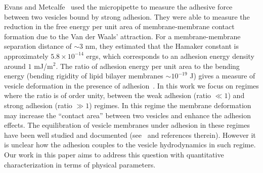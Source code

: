 \documentclass[prf,superscriptaddress,showpacs]{revtex4-1}
\begin{document}
Evans and Metcalfe~\cite{EvansMetcalfe1984_BJ} used the micropipette to measure the adhesive force between two vesicles bound by strong adhesion.
They were able to  measure the
reduction in the free energy per unit area of membrane-membrane contact
formation due to the Van der Waals' attraction. For a membrane-membrane
separation distance of $\sim 3$ nm, they estimated that the Hamaker
constant is approximately $5.8\times 10^{-14}$ ergs, which corresponds
to an adhesion energy density around $1$ mJ/m$^2$. The ratio of adhesion
energy per unit area to the bending energy (bending rigidity of lipid
bilayer membranes $\sim 10^{-19}$ J) gives a measure of vesicle
deformation in the presence of
adhesion~\cite{RamachandranAndersonLealIsraelachvili2010_Langmuir}. In
this work we focus on regimes where the ratio is of order unity, between
the weak adhesion (ratio $\ll 1$) and strong adhesion (ratio $\gg 1$)
regimes.  In this regime the membrane deformation may increase the
``contact area'' between two vesicles and enhance the adhesion effects.
The equilibration of vesicle membranes under adhesion in these regimes
have been well studied and documented
(see~\cite{RamachandranAndersonLealIsraelachvili2010_Langmuir} and
references therein). However it is unclear how the adhesion couples to
the vesicle hydrodynamics in such regime.  Our work in this paper aims
to address this question with quantitative characterization in terms of
physical parameters.

%
% 
% 
\end{document}
